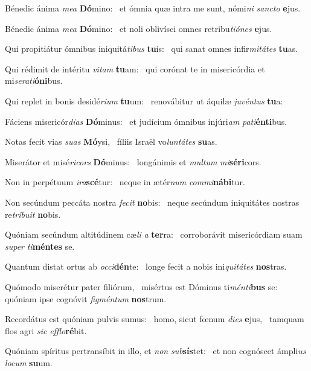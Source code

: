 \item Bénedic ánima \textit{mea} \textbf{Dó}mino:~\psstar{} et ómnia quæ intra me sunt, nómi\textit{ni} \textit{sancto} \textbf{e}jus.
\item Bénedic ánima \textit{mea} \textbf{Dó}mino:~\psstar{} et noli oblivísci omnes retribu\textit{tiónes} \textbf{e}jus.
\item Qui propitiátur ómnibus iniquitá\textit{tibus} \textbf{tu}is:~\psstar{} qui sanat omnes infir\textit{mitátes} \textbf{tu}as.
\item Qui rédimit de intéritu \textit{vitam} \textbf{tu}am:~\psstar{} qui corónat te in misericórdia et mi\textit{serati}\textbf{ó}\textbf{ni}bus.
\item Qui replet in bonis desidé\textit{rium} \textbf{tu}um:~\psstar{} renovábitur ut áquilæ \textit{juvéntus} \textbf{tu}a:
\item Fáciens misericór\textit{dias} \textbf{Dó}mi\-nus:~\psstar{} et judícium ómnibus injúri\textit{am} \textit{pati}\textbf{én}\textbf{ti}bus.
\item Notas fecit vias \textit{suas} \textbf{Mó}ysi,~\psstar{} fíliis Israël vo\textit{luntátes} \textbf{su}as.
\item Miserátor et misé\textit{ricors} \textbf{Dó}minus:~\psstar{} longánimis et \textit{multum} \textit{mi}\textbf{sé}\textbf{ri}cors.
\item Non in perpétuum \textit{ira}\textbf{scé}tur:~\psstar{} neque in ætér\textit{num} \textit{commi}\textbf{ná}\textbf{bi}tur.
\item Non secúndum peccáta nostra \textit{fecit} \textbf{no}bis:~\psstar{} neque secúndum iniquitátes nostras re\textit{tríbuit} \textbf{no}bis.
\item Quóniam secúndum altitúdinem cæ\textit{li} \textit{a} \textbf{ter}ra:~\psstar{} corroborávit misericórdiam suam \textit{super} \textit{ti}\textbf{mén}\textbf{tes} se.
\item Quantum distat ortus ab \textit{occi}\textbf{dén}te:~\psstar{} longe fecit a nobis ini\textit{quitátes} \textbf{nos}tras.
\item Quómodo miserétur pater filiórum,~\pscross{} misértus est Dóminus ti\textit{ménti}\textbf{bus} se:~\psstar{} quóniam ipse cognóvit \textit{figméntum} \textbf{nos}trum.
\item Recordátus est quóniam pulvis sumus:~\pscross{} homo, sicut fœnum \textit{dies} \textbf{e}jus,~\psstar{} tamquam flos agri \textit{sic} \textit{efflo}\textbf{ré}bit.
\item Quóniam spíritus pertransíbit in illo, et \textit{non} \textit{sub}\textbf{sís}tet:~\psstar{} et non cognóscet ámpli\textit{us} \textit{locum} \textbf{su}um.

